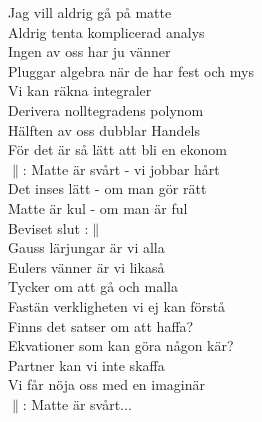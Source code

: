 \documentclass[a6paper,10pt,twoside]{article}
\begin{document}
\noindent
\begin{center}
\end{center}
\begin{lyrics}
Jag vill aldrig gå på matte\\
Aldrig tenta komplicerad analys\\
Ingen av oss har ju vänner\\
Pluggar algebra när de har fest och mys\\
\newline
Vi kan räkna integraler\\
Derivera nolltegradens polynom\\
Hälften av oss dubblar Handels\\
För det är så lätt att bli en ekonom\\
\newline
$\|$: Matte är svårt - vi jobbar hårt\\
Det inses lätt - om man gör rätt\\
Matte är kul - om man är ful\\
Beviset slut :$\|$\\
\newline
Gauss lärjungar är vi alla\\
Eulers vänner är vi likaså\\
Tycker om att gå och malla\\
Fastän verkligheten vi ej kan förstå\\
\newline
Finns det satser om att haffa?\\
Ekvationer som kan göra någon kär?\\
Partner kan vi inte skaffa\\
Vi får nöja oss med en imaginär\\
\newline
$\|$: Matte är svårt...
\end{lyrics}
\end{document}
